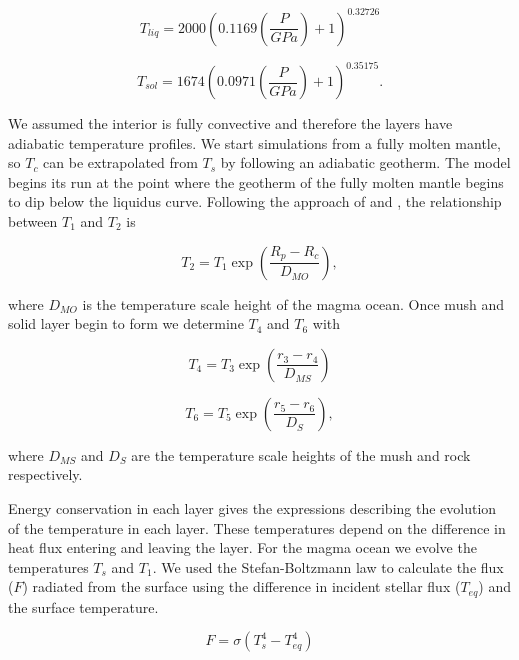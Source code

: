 \documentclass[fleqn,usenatbib]{mnras}
\begin{document}
\begin{equation}
\label{Eqn1}
T_{liq} = 2000 \left(0.1169 \left(\frac{P}{GPa}\right) + 1\right)^{0.32726}
\end{equation}

\begin{equation}
\label{Eqn2}
T_{sol} = 1674 \left(0.0971 \left(\frac{P}{GPa}\right) + 1\right)^{0.35175}.
\end{equation}

We assumed the interior is fully convective and therefore the layers have adiabatic temperature profiles. We start simulations from a fully molten mantle, so $T_{c}$ can be extrapolated from $T_{s}$ by following an adiabatic geotherm. The model begins its run at the point where the geotherm of the fully molten mantle begins to dip below the liquidus curve. Following the approach of \cite{Lab2003} and \cite{Lab2015}, the relationship between $T_{1}$ and $T_{2}$ is 

\begin{equation}
\label{Eqn3}
T_{2} = T_{1} \exp \left(\frac{R_{p} - R_{c}}{D_{MO}}\right),
\end{equation}

\noindent where $D_{MO}$ is the temperature scale height of the magma ocean. Once mush and solid layer begin to form we determine $T_{4}$ and $T_{6}$ with 

\begin{equation}
\label{Eqn4}
T_{4} = T_{3} \exp \left(\frac{r_{3} - r_{4}}{D_{MS}}\right)
\end{equation}

\begin{equation}
\label{Eqn5}
T_{6} = T_{5} \exp \left(\frac{r_{5} - r_{6}}{D_{S}}\right),
\end{equation}

\noindent where $D_{MS}$ and $D_{S}$ are the temperature scale heights of the mush and rock respectively. 

Energy conservation in each layer gives the expressions describing the evolution of the temperature in each layer. These temperatures depend on the difference in heat flux entering and leaving the layer. For the magma ocean we evolve the temperatures $T_{s}$ and $T_{1}$. We used the Stefan-Boltzmann law to calculate the flux ($F$) radiated from the surface using the difference in incident stellar flux ($T_{eq}$) and the surface temperature. 

\begin{equation}
\label{Eqn6}
F =  \sigma \left(T_{s}^{4} - T_{eq}^{4}\right)
\end{equation}
\end{document}
